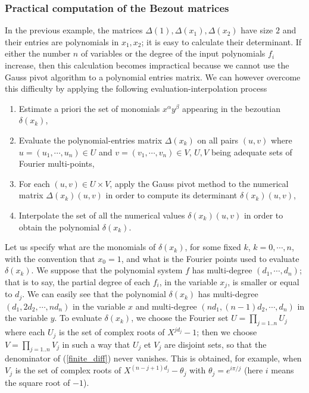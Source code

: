\documentclass{standalone}
\begin{document}
\subsubsection{Practical computation of the Bezout matrices}
In the previous example, the matrices $\Delta(1), \Delta(x_1), \Delta(x_2)$ have size $2$ and their entries are polynomials in $x_1, x_2$; it is easy to calculate their determinant. If either the number  $n$ of variables or the degree of the input polynomials $f_i$ increase, then this calculation becomes impractical because we cannot use the Gauss pivot algorithm to a polynomial entries matrix. We can however overcome this difficulty by applying the following evaluation-interpolation process
\begin{enumerate}
\item
Estimate a priori the set of monomials $x^\alpha y^\beta$ appearing in the bezoutian $\delta(x_k)$,
\item
Evaluate the polynomial-entries matrix $\Delta(x_k)$ on all pairs $(u, v)$ where $u = (u_1,\cdots, u_n) \in U$ and $v = (v_1,\cdots, v_n) \in V$, $U, V$ being adequate sets of Fourier multi-points,
\item
For each $(u, v) \in U\times V$, apply the Gauss pivot method to the numerical matrix $\Delta(x_k)(u, v)$ in order to compute its determinant $\delta(x_k)(u, v)$,
\item
Interpolate the set of all the numerical values $\delta(x_k)(u, v)$ in order to obtain the polynomial $\delta(x_k)$.
\end{enumerate}
Let us specify what are the monomials of $\delta(x_k)$, for some fixed $k$, $k = 0,\cdots, n$, with the convention that $x_0 = 1$, and what is the Fourier points used to evaluate $\delta(x_k)$. We suppose that the polynomial system $f$ has multi-degree $(d_1, \cdots, d_n)$; that is to say, the partial degree of each $f_i$, in the variable $x_j$, is smaller or equal to $d_j$. We can easily see that the polynomial $\delta(x_k)$ has multi-degree $(d_1, 2d_2, \cdots, nd_n)$ in the variable $x$ and multi-degree $(nd_1, (n-1)d_2, \cdots, d_n)$ in the variable $y$. To evaluate $\delta(x_k)$, we choose the Fourier set $U = \prod_{j=1..n} U_j$ where each $U_j$ is the set of complex roots of $X^{jd_j} - 1$; then we choose $V = \prod_{j=1..n} V_j$ in such a way that $U_j$ et $V_j$ are disjoint sets, so that the denominator of (\ref{finite_diff}) never vanishes. This is obtained, for example, when $V_j$ is the set of complex roots of $X^{(n-j+1)d_j} - \theta_j$ with $\theta_j = e^{i\pi/j}$ (here $i$ means the square root of $-1$). 
\end{document}
